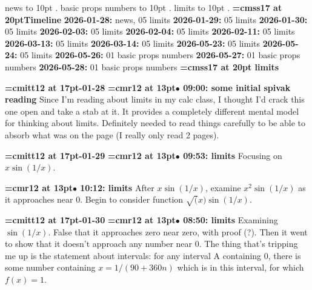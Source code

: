 
\pdfpagewidth=148mm
\pdfpageheight=210mm
\hsize=128mm
\vsize=190mm

\pdfhorigin=0pt
\pdfvorigin=0pt
\hoffset=10mm
\voffset=10mm
\noindent news \leaders\hbox to 10pt {\hss.\hss}  \hfill {}
\smallskip
{} basic props numbers \leaders\hbox to 10pt {\hss.\hss}  \hfill {}
\smallskip
{} limits \leaders\hbox to 10pt {\hss.\hss}  \hfill {}
\smallskip
\vfill \break
{\medskip\noindent\bf\font\titlefont=cmss17 at 20pt\titlefont Timeline}\medskip
{\noindent \bf 2026-01-28:} news, 05 limits\smallskip
{\noindent \bf 2026-01-29:} 05 limits\smallskip
{\noindent \bf 2026-01-30:} 05 limits\smallskip
{\noindent \bf 2026-02-03:} 05 limits\smallskip
{\noindent \bf 2026-02-04:} 05 limits\smallskip
{\noindent \bf 2026-02-11:} 05 limits\smallskip
{\noindent \bf 2026-03-13:} 05 limits\smallskip
{\noindent \bf 2026-03-14:} 05 limits\smallskip
{\noindent \bf 2026-05-23:} 05 limits\smallskip
{\noindent \bf 2026-05-24:} 05 limits\smallskip
{\noindent \bf 2026-05-26:} 01 basic props numbers\smallskip
{\noindent \bf 2026-05-27:} 01 basic props numbers\smallskip
{\noindent \bf 2026-05-28:} 01 basic props numbers\smallskip
\vfill \break
{}
{\medskip\noindent\bf\font\titlefont=cmss17 at 20pt limits}\medskip

{\medskip\noindent\bf\font\titlefont=cmitt12 at 17pt-01-28}\medskip
{\smallskip\noindent\bf\font\titlefont=cmr12 at 13pt\titlefont $\bullet$ 09:00: some initial spivak reading}\smallskip
Since I'm reading about limits in my calc class, I thought I'd crack this one open and take a stab at it. It provides a completely different mental model for thinking about limits. Definitely needed to read things carefully to be able to absorb what was on the page (I really only read 2 pages).
\par

{\medskip\noindent\bf\font\titlefont=cmitt12 at 17pt-01-29}\medskip
{\smallskip\noindent\bf\font\titlefont=cmr12 at 13pt\titlefont $\bullet$ 09:53: limits}\smallskip
Focusing on $x\sin(1/x)$.
\par

{\smallskip\noindent\bf\font\titlefont=cmr12 at 13pt\titlefont $\bullet$ 10:12: limits}\smallskip
After $x\sin(1/x)$, examine $x^2\sin(1/x)$ as it approaches near 0. Begin to consider function $\sqrt(x)\sin(1/x)$.
\par

{\medskip\noindent\bf\font\titlefont=cmitt12 at 17pt-01-30}\medskip
{\smallskip\noindent\bf\font\titlefont=cmr12 at 13pt\titlefont $\bullet$ 08:50: limits}\smallskip
Examining $\sin(1/x)$. False that it approaches zero near zero, with proof (?). Then it went to show that it doesn't approach any number near 0. The thing that's tripping me up is the statement about intervals: for any interval A containing 0, there is some number containing $x = 1 / (90 + 360n)$ which is in this interval, for which $f(x) = 1$.
\par

